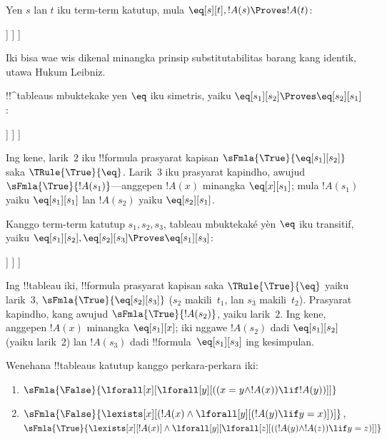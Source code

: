 \documentclass[../../../include/open-logic-section]{subfiles}
\begin{document}
\begin{ex}
Yen $s$ lan $t$ iku term-term katutup, mula $\eq[s][t], !A(s)
\Proves !A(t)$:
\begin{oltableau}
  [\sFmla{\False}{\formula{A}(t)}, just = \TAss
    [\sFmla{\True}{\eq[s][t]}, just = \TAss
      [\sFmla{\True}{\formula{A}(s)}, just = \TAss
        [\sFmla{\True}{\formula{A}(t)}, just={\TRule{\True}{\eq}[2, 3]}, close]
      ]
    ]
  ]
\end{oltableau}
Iki bisa wae wis dikenal minangka prinsip substitutabilitas barang
kang identik, utawa Hukum Leibniz.

!!^{tableau}s mbuktekake yen $\eq$ iku simetris, yaiku
$\eq[s_1][s_2] \Proves \eq[s_2][s_1]$:
\begin{oltableau}
  [\sFmla{\False}{\eq[s_2][s_1]}, just = \TAss
    [\sFmla{\True}{\eq[s_1][s_2]}, just = \TAss
      [\sFmla{\True}{\eq[s_1][s_1]}, just = {$\eq$}
        [\sFmla{\True}{\eq[s_2][s_1]}, just = {\TRule{\True}{\eq}[2, 3]}, close]
      ]
    ]
  ]
\end{oltableau}
Ing kene, larik~$2$ iku !!{formula} prasyarat kapisan
$\sFmla{\True}{\eq[s_1][s_2]}$ saka $\TRule{\True}{\eq}$.
Larik~$3$ iku prasyarat kapindho, awujud
$\sFmla{\True}{!A(s_1)}$---anggepen $!A(x)$ minangka
$\eq[x][s_1]$; mula $!A(s_1)$ yaiku $\eq[s_1][s_1]$ lan $!A(s_2)$
yaiku $\eq[s_2][s_1]$.

Kanggo term-term katutup $s_1,s_2,s_3$, tableau mbuktekaké yèn $\eq$ iku transitif, yaiku
$\eq[s_1][s_2], \eq[s_2][s_3] \Proves \eq[s_1][s_3]$:
\begin{oltableau}
  [\sFmla{\False}{\eq[s_1][s_3]}, just = \TAss
    [\sFmla{\True}{\eq[s_1][s_2]}, just = \TAss
      [\sFmla{\True}{\eq[s_2][s_3]}, just = \TAss
        [\sFmla{\True}{\eq[s_1][s_3]}, just = {\TRule{\True}{\eq}[3, 2]}, close]
      ]
    ]
  ]
\end{oltableau}
Ing !!{tableau} iki, !!{formula} prasyarat kapisan saka
$\TRule{\True}{\eq}$ yaiku larik~$3$,
$\sFmla{\True}{\eq[s_2][s_3]}$ ($s_2$ makili~$t_1$, lan
$s_3$ makili~$t_2$). Prasyarat kapindho, kang awujud
$\sFmla{\True}{!A(s_2)}$, yaiku larik~$2$. Ing kene, anggepen
$!A(x)$ minangka $\eq[s_1][x]$; iki nggawe $!A(s_2)$ dadi
$\eq[s_1][s_2]$ (yaiku larik~$2$) lan $!A(s_3)$ dadi
!!{formula}~$\eq[s_1][s_3]$ ing kesimpulan.
\end{ex}

\begin{prob}
Wenehana !!{tableau}s katutup kanggo perkara-perkara iki:
\begin{enumerate}
\item $\sFmla{\False}{\lforall[x][\lforall[y][((x = y \land !A(x))
      \lif !A(y))]]}$
\item $\sFmla{\False}{\lexists[x][(!A(x) \land
    \lforall[y][(!A(y) \lif y = x)])]}$,\\
  $\sFmla{\True}{\lexists[x][!A(x)] \land
    \lforall[y][\lforall[z][((!A(y) \land !A(z)) \lif y = z)]]}$
\end{enumerate}
\end{prob}
\end{document}
